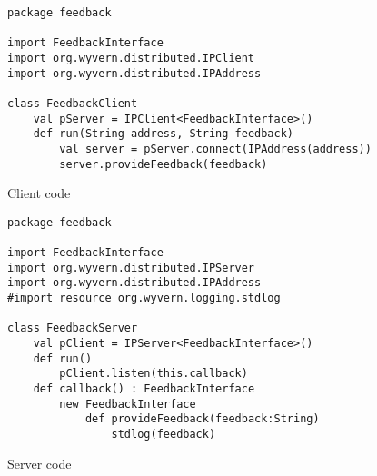 \documentclass[runningheads]{llncs}
\begin{document}
\begin{sloppypar}
\begin{figure}[t]
\begin{lstlisting}
package feedback

import FeedbackInterface
import org.wyvern.distributed.IPClient
import org.wyvern.distributed.IPAddress

class FeedbackClient
    val pServer = IPClient<FeedbackInterface>()
    def run(String address, String feedback)
        val server = pServer.connect(IPAddress(address))
        server.provideFeedback(feedback)
\end{lstlisting}
\caption{Client code}
\label{f-client}
\end{figure}

\begin{figure}[t]
\begin{lstlisting}
package feedback

import FeedbackInterface
import org.wyvern.distributed.IPServer
import org.wyvern.distributed.IPAddress
#import resource org.wyvern.logging.stdlog

class FeedbackServer
    val pClient = IPServer<FeedbackInterface>()
    def run()
        pClient.listen(this.callback)
    def callback() : FeedbackInterface
        new FeedbackInterface
            def provideFeedback(feedback:String)
                stdlog(feedback)

\end{lstlisting}
\caption{Server code}
\label{f-server}
\end{figure}






\end{sloppypar}
\end{document}
